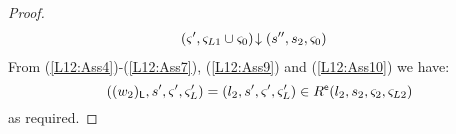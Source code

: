 \begin{lemma}[]
\begin{proof}
\begin{align}
%
	& \extendsAM{\amod{}', \amod{L1} \cup \amod{0}}{s''}{s_2}{\amod{0}}  \label{L12:Ass10}
\end{align}
%
From (\ref{L12:Ass4})-(\ref{L12:Ass7}), (\ref{L12:Ass9}) and (\ref{L12:Ass10}) we have:
%
\begin{equation}
	((w_2)_{\textsf{L}}, s', \varsigma_{}', \varsigma_{L}') = (l_2, s', \varsigma_{}', \varsigma_{L}') \in R^{\textsf{e}}(l_2, s_2, \varsigma_{2}, \varsigma_{L2}) \nonumber
\end{equation}
% 
as required.
\end{proof}
%
%
\end{lemma}
%
%
